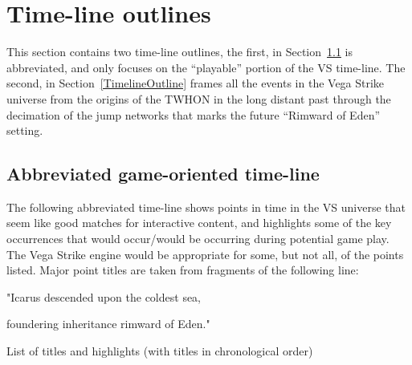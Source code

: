 \label{chapt:timelines}
\section{Time-line outlines}

This section contains two time-line outlines, the first, in
Section~\ref{Abbrevtimeline} is abbreviated, and only focuses on the
``playable'' portion of the VS time-line. The second, in
Section~\ref{TimelineOutline} frames all the events in the Vega Strike
universe from the origins of the TWHON in the long distant past
through the decimation of the jump networks that marks the future
``Rimward of Eden'' setting.

\subsection{Abbreviated game-oriented time-line}
\label{Abbrevtimeline}
The following abbreviated time-line shows points in time in the VS
universe that seem like good matches for interactive content, and
highlights some of the key occurrences that would occur/would be
occurring during potential game play. The Vega Strike engine would be
appropriate for some, but not all, of the points listed. Major point
titles are taken from fragments of the following line:

{\Large
 \centerline{"Icarus descended upon the coldest sea,}
 \centerline{foundering inheritance rimward of Eden."}
 }

List of titles and highlights (with titles in chronological order)


